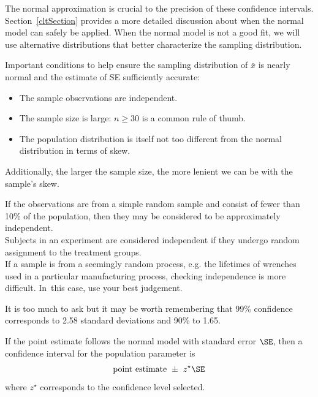 The normal approximation is crucial to the precision of these confidence intervals. Section~\ref{cltSection} provides a more detailed discussion about when the normal model can safely be applied. When the normal model is not a good fit, we will use alternative distributions that better characterize the sampling distribution.

\begin{termBox}{
Important conditions to help ensure the sampling distribution of $\bar{x}$ is nearly normal and the estimate of SE sufficiently accurate:
\begin{itemize}
\setlength{\itemsep}{0mm}
\item The sample observations are independent.
\item The sample size is large: $n\geq30$ is a common rule of thumb.
\item The population distribution is itself not too different from the normal distribution in terms of skew.
\end{itemize}
Additionally, the larger the sample size, the more lenient we can be with the sample's skew.}
\end{termBox}

\begin{tipBox}{
If the observations are from a simple random sample and consist of fewer than 10\% of the population, then they may be considered to be approximately independent.\\[2mm]
Subjects in an experiment are considered independent if they undergo random assignment to the treatment groups. \\[2mm]
If a sample is from a seemingly random process, e.g. the lifetimes of wrenches used in a particular manufacturing process, checking independence is more difficult. In~this case, use your best judgement.}
\end{tipBox}


It is too much to ask but it may be worth remembering that 99\% confidence corresponds to 2.58 standard deviations and 90\% to 1.65.


\begin{termBox}{
If the point estimate follows the normal model with standard error $\SE$, then a confidence interval for the population parameter is
\begin{eqnarray*}
\text{point estimate}\ \pm\ z^{\star} \SE
\end{eqnarray*}
where $z^{\star}$ corresponds to the confidence level selected.}
\end{termBox}

